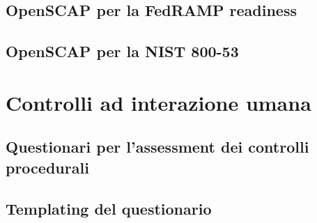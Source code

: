 \documentclass[../main.tex]{subfiles}
\begin{document}
\subsection{OpenSCAP per la FedRAMP readiness}
\subsection{OpenSCAP per la NIST 800-53}
\section{Controlli ad interazione umana}
\subsection{Questionari per l'assessment dei controlli procedurali}
\subsection{Templating del questionario}
\end{document}
